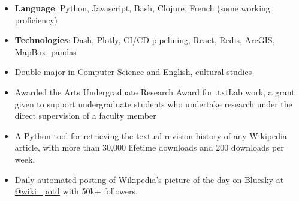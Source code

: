 \begin{itemize}
\item \textbf{Language}: Python, Javascript, Bash, Clojure, French (some working proficiency)
\item \textbf{Technologies}: Dash, Plotly, CI/CD pipelining, React, Redis, ArcGIS, MapBox, pandas
\end{itemize}

\begin{itemize}
\item Double major in Computer Science and English, cultural studies
\item Awarded the Arts Undergraduate Research Award for .txtLab work, a grant given to support undergraduate students who undertake research under the direct supervision of a faculty member
\end{itemize}

\begin{itemize}
\item A Python tool for retrieving the textual revision history of any Wikipedia article, with more than 30,000 lifetime downloads and 200 downloads per week.
\end{itemize}
\begin{itemize}
\item Daily automated posting of Wikipedia's picture of the day on Bluesky at \href{https://bsky.app/profile/wiki-potd.bsky.social}{@wiki\_potd} with 50k+ followers.
\end{itemize}

